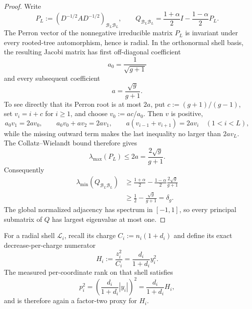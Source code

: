 \begin{proof}
Write
\begin{equation*}
 P_L:=\left(D^{-1/2}AD^{-1/2}\right)_{\mathcal B_L\mathcal B_L},
 \qquad
 Q_{\mathcal B_L\mathcal B_L}
 =\frac{1+\alpha}{2}I-\frac{1-\alpha}{2}P_L.
\end{equation*}
The Perron vector of the nonnegative irreducible matrix $P_L$ is invariant
under every rooted-tree automorphism, hence is radial.  In the orthonormal
shell basis, the resulting Jacobi matrix has first off-diagonal coefficient
\begin{equation*}
 a_0=\frac1{\sqrt{g+1}}
\end{equation*}
and every subsequent coefficient
\begin{equation*}
 a=\frac{\sqrt g}{g+1}.
\end{equation*}
To see directly that its Perron root is at most $2a$, put
$c:=(g+1)/(g-1)$, set $v_i=i+c$ for $i\geq1$, and choose
$v_0:=ac/a_0$.  Then $v$ is positive,
\begin{equation*}
 a_0v_1=2av_0,
 \qquad
 a_0v_0+av_2=2av_1,
 \qquad
 a(v_{i-1}+v_{i+1})=2av_i\quad(1<i<L),
\end{equation*}
while the missing outward term makes the last inequality no larger than
$2av_L$.  The Collatz--Wielandt bound therefore gives
\begin{equation*}
 \lambda_{\max}(P_L)\leq2a=\frac{2\sqrt g}{g+1}.
\end{equation*}
Consequently
\begin{align*}
 \lambda_{\min}(Q_{\mathcal B_L\mathcal B_L})
 &\geq\frac{1+\alpha}{2}
 -\frac{1-\alpha}{2}\frac{2\sqrt g}{g+1}\\
 &\geq\frac12-\frac{\sqrt g}{g+1}=\delta_g.
\end{align*}
The global normalized adjacency has spectrum in $[-1,1]$, so every
principal submatrix of $Q$ has largest eigenvalue at most one.
\end{proof}

For a radial shell $\mathcal L_i$, recall its charge
$C_i:=n_i(1+d_i)$ and define its exact decrease-per-charge numerator
\begin{equation}
 H_i:=\frac{z_i^2}{C_i}
 =\frac{d_i}{1+d_i}y_i^2.
 \label{eq:direct-radial-block-score}
\end{equation}
The measured per-coordinate rank on that shell satisfies
\begin{equation}
 p_i^2
 =\left(\frac{d_i}{1+d_i}|y_i|\right)^2
 =\frac{d_i}{1+d_i}H_i,
 \label{eq:direct-radial-score-comparison}
\end{equation}
and is therefore again a factor-two proxy for $H_i$.

